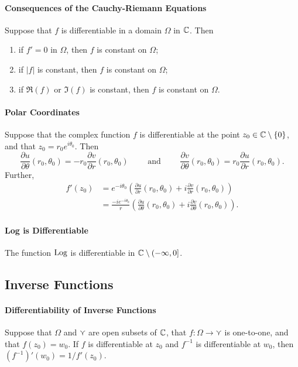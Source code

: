 \paragraph{Consequences of the Cauchy-Riemann Equations}
Suppose that \(f\) is differentiable in a domain \(\Omega\) in \(\mathbb{C}\). Then
\begin{enumerate}[label=(\alph*)]
    \item if \(f' = 0\) in \(\Omega\), then \(f\) is constant on \(\Omega\);
    \item if \(|f|\) is constant, then \(f\) is constant on \(\Omega\);
    \item if \(\Re(f)\) or \(\Im(f)\) is constant, then \(f\) is constant on \(\Omega\).
\end{enumerate}

\paragraph{Polar Coordinates}
Suppose that the complex function \(f\) is differentiable at the point \(z_0 \in \mathbb{C} \setminus \{0\}\), and that \(z_0 = r_0e^{i\theta_0}\). Then
\[\frac{\partial u}{\partial \theta}(r_0, \theta_0) = -r_0\frac{\partial v}{\partial r}(r_0, \theta_0) \qquad \text{ and } \qquad \frac{\partial v}{\partial \theta}(r_0, \theta_0) = r_0\frac{\partial u}{\partial r}(r_0, \theta_0).\]
Further,
\begin{align*}
    f'(z_0) & = e^{-i\theta_0}\left(\frac{\partial u}{\partial r}(r_0, \theta_0) + i\frac{\partial v}{\partial r}(r_0, \theta_0)\right) \\
    & = \frac{-ie^{-i\theta_0}}{r}\left(\frac{\partial u}{\partial \theta}(r_0, \theta_0) + i\frac{\partial v}{\partial \theta}(r_0, \theta_0)\right).
\end{align*}

\paragraph{Log is Differentiable}
The function \(\mathrm{Log}\) is differentiable in \(\mathbb{C} \setminus (-\infty, 0]\).

\subsection{Inverse Functions}
\paragraph{Differentiability of Inverse Functions}
Suppose that \(\Omega\) and \(\curlyvee\) are open subsets of \(\mathbb{C}\), that \(f: \Omega \to \curlyvee\) is one-to-one, and that \(f(z_0) = w_0\). If \(f\) is differentiable at \(z_0\) and \(f^{-1}\) is differentiable at \(w_0\), then \((f^{-1})'(w_0) = 1/f'(z_0)\).

